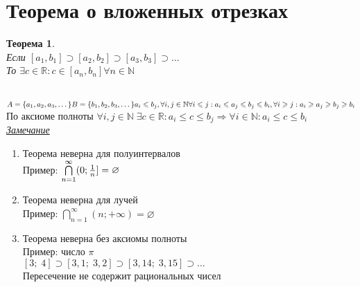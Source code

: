 \documentclass[12pt,letterpaper]{report}
\makeatletter
\newtheorem*{theorem-non}{Теорема}
\theoremstyle{definition}
\newcommand{\N}{\mathbb{N}}
\newcommand{\R}{\mathbb{R}}
\newcommand{\notice}{\underline{\textit{Замечание }}}
\renewenvironment{proof}[1][\proofname]{%
   \par\pushQED{\qed}\normalfont%
   \topsep6\p@\@plus6\p@\relax
   \trivlist\item[\hskip\labelsep\bfseries#1\@addpunct{.}]%
   \ignorespaces
}{%
   \popQED\endtrivlist\@endpefalse
}
\makeatother
\begin{document}
\section{Теорема о вложенных отрезках}
\begin{theorem-non}
    \quad \\
    Если $[a_1, b_1] \supset [a_2, b_2] \supset [a_3, b_3] \supset \dots$ \\
    То $\exists c\in \R : c \in [a_n, b_n] \forall n \in \N$
\end{theorem-non}
\begin{proof}
    \quad \\
    $A = \{a_1, a_2, a_3, \dots\} \\
    B = \{b_1, b_2, b_3, \dots\} \\
    a_i \leqslant b_j, \forall i,j \in \N \\
    \forall i \leqslant j : a_i \leqslant a_j \leqslant b_j \leqslant b_i, \forall i \geqslant j : a_i \geqslant a_j \geqslant b_j \geqslant b_i$ \\
    По аксиоме полноты $\forall i, j \in \N \; \exists c \in \R: a_i \leqslant c \leqslant b_j \Longrightarrow \forall i \in \N : a_i \leqslant c \leqslant b_i$ \\
\end{proof}
\notice
\begin{enumerate}
    \item Теорема неверна для полуинтервалов \\
    Пример: $\bigcap\limits_{n = 1}^{\infty}(0; {{1}\over{n}}] = \varnothing$
    \item Теорема неверна для лучей \\
    Пример: $\bigcap\limits_{n = 1}^{\infty}(n; +\infty) = \varnothing$
    \item Теорема неверна без аксиомы полноты \\
    Пример: число $\pi$ \\
    $[3;\; 4] \supset [3,1;\; 3,2] \supset [3,14;\; 3,15] \supset \dots$ \\
    Пересечение не содержит рациональных чисел
\end{enumerate}
\end{document}
